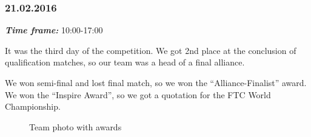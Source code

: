 \subsubsection{21.02.2016}
\textit{\textbf{Time frame:}} 10:00-17:00 

It was the third day of the competition. We got 2nd place at the conclusion of qualification matches, so our team was a head of a final alliance. 

We won semi-final and lost final match, so we won the “Alliance-Finalist” award. We won the “Inspire Award”, so we got a quotation for the FTC World Championship.

\begin{figure}[H]
	\begin{minipage}[h]{1\linewidth}
		\caption{Team photo with awards}
	\end{minipage}
\end{figure}
